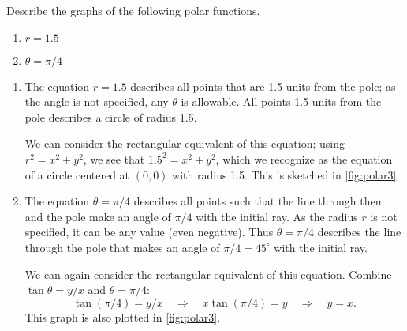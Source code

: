 \begin{example}\label{ex_polar3}%
Describe the graphs of the following polar functions.
\begin{enumerate}
	\item $r = 1.5$
	\item $\theta = \pi/4 $
\end{enumerate}
%
\solution
\begin{enumerate}
\item		The equation $r=1.5$ describes all points that are 1.5 units from the pole; as the angle is not specified, any $\theta$ is allowable. All points 1.5 units from the pole describes a circle of radius 1.5.

We can consider the rectangular equivalent of this equation; using $r^2=x^2+y^2$, we see that $1.5^2=x^2+y^2$, which we recognize as the equation of a circle centered at $(0,0)$ with radius 1.5. This is sketched in \autoref{fig:polar3}.


\item		The equation $\theta = \pi/4$ describes all points such that the line through them and the pole make an angle of $\pi/4$ with the initial ray. As the radius $r$ is not specified, it can be any value (even negative). Thus $\theta = \pi/4$ describes the line through the pole that makes an angle of $\pi/4 = 45^\circ$ with the initial ray.

We can again consider the rectangular equivalent of this equation. Combine $\tan \theta =y/x$ and $\theta =\pi/4$:
\[\tan(\pi/4) = y/x \quad \Rightarrow \quad x\tan(\pi/4) = y \quad \Rightarrow \quad y = x.\] 
This graph is also plotted in \autoref{fig:polar3}.
\end{enumerate}
\end{example}

